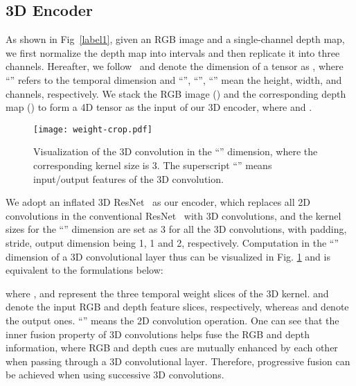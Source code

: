 \documentclass[letterpaper]{article}
\begin{document}
\subsection{3D Encoder}
As shown in Fig~\ref{label1}, given an RGB image and a single-channel depth map, we first normalize the depth map into intervals  and then replicate it into three channels. Hereafter, we follow~\cite{wang2018non} and denote the dimension of a tensor as , where ``'' refers to the temporal dimension and ``'', ``'', ``'' mean the height, width, and channels, respectively. We stack the RGB image () and the corresponding depth map () to form a 4D tensor as the input of our 3D encoder, where  and .
\begin{figure}
	\centering
	\texttt{[image: weight-crop.pdf]}\vspace{-0.4cm}
	\caption{\small Visualization of the 3D convolution in the ``'' dimension, where the corresponding kernel size is 3. The superscript ``'' means input/output features of the 3D convolution.}\vspace{-0.5cm}
	\label{3dconv}
\end{figure}
We adopt an inflated 3D ResNet~\cite{carreira2017quo} as our encoder, which replaces all 2D convolutions in the conventional ResNet~\cite{ResNET} with 3D convolutions, and the kernel sizes for the ``'' dimension are set as 3 for all the  3D convolutions, with padding, stride, output dimension being 1, 1 and 2, respectively. Computation in the ``'' dimension of a 3D convolutional layer thus can be visualized in Fig. \ref{3dconv} and is equivalent to the formulations below:

\vspace{-0.2cm}

where ,  and  represent the three temporal weight slices of the 3D kernel.  and  denote the input RGB and depth feature slices, respectively, whereas  and  denote the output ones. ``'' means the 2D convolution operation. One can see that the inner fusion property of 3D convolutions helps fuse the RGB and depth information, where RGB and depth cues are mutually enhanced by each other when passing through a 3D convolutional layer. Therefore, progressive fusion can be achieved when using successive 3D convolutions.
\end{document}
